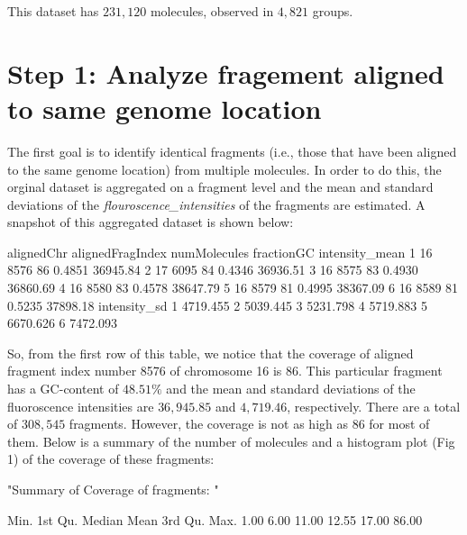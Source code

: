 \documentclass[11pt]{article}
\begin{document}
\noindent
This dataset has $231,120$ molecules, observed in $4,821$ groups. 

\section{Step 1: Analyze fragement aligned to same genome location}
The first goal is to identify identical fragments (i.e., those that have been aligned to the same genome location) from multiple molecules. In order to do this, the orginal dataset is aggregated on a fragment level and the mean and standard deviations of the {\emph{flouroscence\_intensities}} of the fragments are estimated. A snapshot of this aggregated dataset is shown below:

\begin{Schunk}
\begin{Soutput}
  alignedChr alignedFragIndex numMolecules fractionGC intensity_mean
1         16             8576           86     0.4851       36945.84
2         17             6095           84     0.4346       36936.51
3         16             8575           83     0.4930       36860.69
4         16             8580           83     0.4578       38647.79
5         16             8579           81     0.4995       38367.09
6         16             8589           81     0.5235       37898.18
  intensity_sd
1     4719.455
2     5039.445
3     5231.798
4     5719.883
5     6670.626
6     7472.093
\end{Soutput}
\end{Schunk}
So, from the first row of this table, we notice that the coverage of aligned fragment index number 8576 of chromosome 16 is 86. This particular fragment has a GC-content of $48.51\%$ and the mean and standard deviations of the fluoroscence intensities are $36,945.85$ and $4,719.46$, respectively. There are a total of $308,545$ fragments. However, the coverage is not as high as 86 for most of them. Below is a summary of the number of molecules and a histogram plot (Fig 1) of the coverage of these fragments:
\begin{Schunk}
\begin{Soutput}
[1] "Summary of Coverage of fragments: "
\end{Soutput}
\begin{Soutput}
   Min. 1st Qu.  Median    Mean 3rd Qu.    Max. 
   1.00    6.00   11.00   12.55   17.00   86.00 
\end{Soutput}
\end{Schunk}
\end{document}
